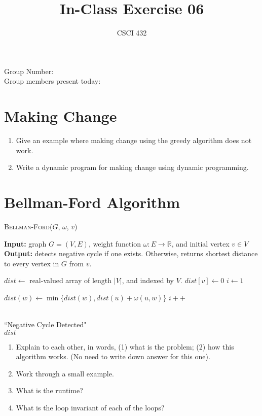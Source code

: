 \documentclass{article}
\title{In-Class Exercise 06}
\author{CSCI 432}
\def\R{{\mathbb R}}
\begin{document}
\maketitle

\noindent
Group Number:\\
Group members present today:

\section*{Making Change}

\begin{enumerate}
\item Give an example where making change using the greedy algorithm does
not work.
\vspace{1in}
\item Write a dynamic program for making change using dynamic programming.
\end{enumerate}

\newpage
\section*{Bellman-Ford Algorithm}
\begin{algorithm}\caption{\textsc{Bellman-Ford}($G$, $\omega$, $v$)}\label{alg:seb}
{\bf Input:} graph $G=(V,E)$, weight function $\omega \colon E \to \R$, and initial vertex $v \in V$ \\
{\bf Output:} detects negative cycle if one exists.  Otherwise, returns
shortest distance to every vertex in $G$ from $v$.\\
\begin{algorithmic}[1]
\State $dist \gets$ real-valued array of length $|V|$, and indexed by $V$.
\State $dist[v] \gets 0$
\State $i \gets 1$

\State $dist(w) \gets \min \{ dist(w), dist(u)+ \omega(u,w) \}$
\EndFor
\State $i++$
\EndWhile

\\
\quad\quad\quad \Return ``Negative Cycle Detected"
\EndIf
\EndFor\\
\Return $dist$
\end{algorithmic}
\end{algorithm}

\begin{enumerate}
\item Explain to each other, in words, (1) what is the problem; (2) how this
algorithm works.  (No need to write down answer for this one).
\item Work through a small example.
\item What is the runtime?
\item What is the loop invariant of each of the loops?
\end{enumerate}
\end{document}

